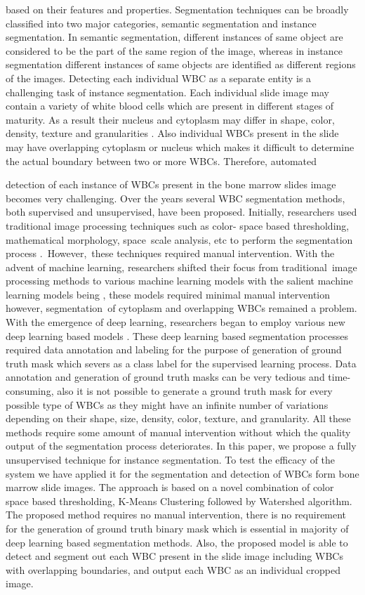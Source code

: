\documentclass[conference]{IEEEtran}
\begin{document}
based on their features and properties. Segmentation techniques can be broadly classified into
two major categories, semantic segmentation and instance segmentation. In semantic
segmentation, different instances of same object are considered to be the part of the same
region of the image, whereas in instance segmentation different instances of same objects are
identified as different regions of the images. Detecting each individual WBC as a separate entity
is a challenging task of instance segmentation. Each individual slide image may contain a variety
of white blood cells which are present in different stages of maturity. As a result their nucleus
and cytoplasm may differ in shape, color, density, texture and granularities \cite{1}. Also individual
WBCs present in the slide may have overlapping cytoplasm or nucleus which makes it difficult
to determine the actual boundary between two or more WBCs. Therefore, automated

detection of each instance of WBCs present in the bone marrow slides image becomes very
challenging.
Over the years several WBC segmentation methods, both supervised and unsupervised, have
been proposed. Initially, researchers used traditional image processing techniques such as
color- space based thresholding, mathematical morphology, space scale analysis, etc to perform
the segmentation process \cite{6}\cite{7}\cite{8}\cite{9}\cite{10}\cite{11}. However, these techniques required manual
intervention. With the advent of machine learning, researchers shifted their focus from
traditional image processing methods to various machine learning models with the salient
machine learning models being \cite{12} \cite{13} \cite{14}, these models required minimal manual
intervention however, segmentation of cytoplasm and overlapping WBCs remained a problem.
With the emergence of deep learning, researchers began to employ various new deep learning
based models \cite{15}\cite{16}. These deep learning based segmentation processes required data
annotation and labeling for the purpose of generation of ground truth mask which severs as a
class label for the supervised learning process. Data annotation and generation of ground truth
masks can be very tedious and time-consuming, also it is not possible to generate a ground
truth mask for every possible type of WBCs as they might have an infinite number of variations
depending on their shape, size, density, color, texture, and granularity. All these methods
require some amount of manual intervention without which the quality output of the
segmentation process deteriorates.
In this paper, we propose a fully unsupervised technique for instance segmentation. To test the
efficacy of the system we have applied it for the segmentation and detection of WBCs form
bone marrow slide images. The approach is based on a novel combination of color space based
thresholding, K-Means Clustering followed by Watershed algorithm. The proposed method
requires no manual intervention, there is no requirement for the generation of ground truth
binary mask which is essential in majority of deep learning based segmentation methods. Also,
the proposed model is able to detect and segment out each WBC present in the slide image
including WBCs with overlapping boundaries, and output each WBC as an individual cropped
image.
\end{document}
